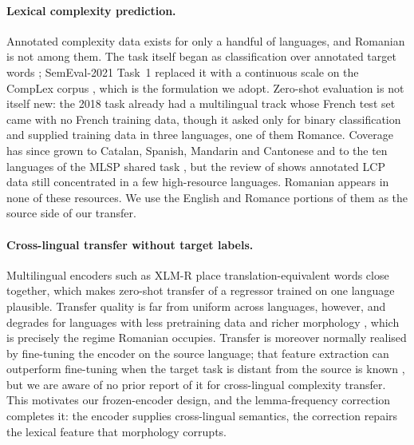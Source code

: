\paragraph{Lexical complexity prediction.}
Annotated complexity data exists for only a handful of languages, and
Romanian is not among them. The task itself began as classification over
annotated target words \citep{yimam-etal-2018-report}; SemEval-2021
Task~1 replaced it with a continuous scale on the CompLex corpus
\citep{shardlow-etal-2021-semeval}, which is the formulation we adopt.
Zero-shot evaluation is not itself new: the 2018 task already had a
multilingual track whose French test set came with no French training
data, though it asked only for binary classification and supplied
training data in three languages, one of them Romance. Coverage has since
grown to
Catalan, Spanish, Mandarin and Cantonese
\citep{saggion-etal-2024-lexical, qiu-etal-2024-complex} and to the ten
languages of the MLSP shared task \citep{shardlow-etal-2024-bea}, but the
review of \citet{shardlow-etal-2024-multilingual} shows annotated LCP
data still concentrated in a few high-resource languages. Romanian
appears in none of these resources. We use the English and Romance
portions of them as the source side of our transfer.

\paragraph{Cross-lingual transfer without target labels.}
Multilingual encoders such as XLM-R \citep{conneau2020xlmr} place
translation-equivalent words close together, which makes zero-shot
transfer of a regressor trained on one language plausible. Transfer
quality is far from uniform across languages, however, and degrades for
languages with less pretraining data and richer morphology
\citep{pires-etal-2019-multilingual, wu-dredze-2020-languages}, which is
precisely the regime Romanian occupies. Transfer is moreover normally
realised by fine-tuning the encoder on the source language; that feature
extraction can outperform fine-tuning when the target task is distant
from the source is known \citep{peters-etal-2019-tune}, but we are aware
of no prior report of it for cross-lingual complexity transfer. This
motivates our frozen-encoder design, and the lemma-frequency correction
completes it: the encoder supplies cross-lingual semantics, the
correction repairs the lexical feature that morphology corrupts.

